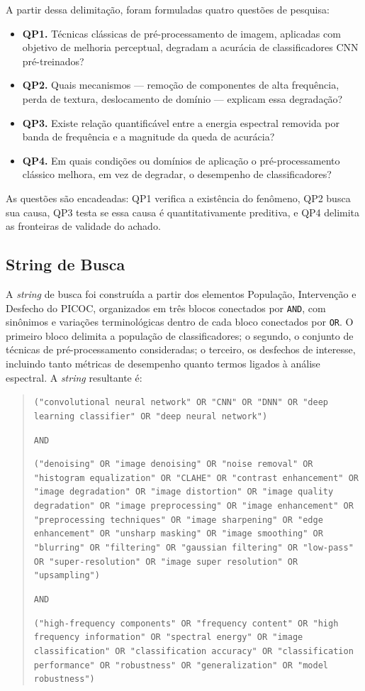 \documentclass[conference]{IEEEtran}
\begin{document}
A partir dessa delimitação, foram formuladas quatro questões de pesquisa:

\begin{itemize}
\item \textbf{QP1.} Técnicas clássicas de pré-processamento de imagem,
aplicadas com objetivo de melhoria perceptual, degradam a acurácia de
classificadores CNN pré-treinados?
\item \textbf{QP2.} Quais mecanismos --- remoção de componentes de alta
frequência, perda de textura, deslocamento de domínio --- explicam essa
degradação?
\item \textbf{QP3.} Existe relação quantificável entre a energia espectral
removida por banda de frequência e a magnitude da queda de acurácia?
\item \textbf{QP4.} Em quais condições ou domínios de aplicação o
pré-processamento clássico melhora, em vez de degradar, o desempenho de
classificadores?
\end{itemize}

As questões são encadeadas: QP1 verifica a existência do fenômeno, QP2 busca
sua causa, QP3 testa se essa causa é quantitativamente preditiva, e QP4
delimita as fronteiras de validade do achado.

\subsection{String de Busca}
\label{sec:sb}

A \textit{string} de busca foi construída a partir dos elementos População,
Intervenção e Desfecho do PICOC, organizados em três blocos conectados por
\texttt{AND}, com sinônimos e variações terminológicas dentro de cada bloco
conectados por \texttt{OR}. O primeiro bloco delimita a população de
classificadores; o segundo, o conjunto de técnicas de pré-processamento
consideradas; o terceiro, os desfechos de interesse, incluindo tanto métricas
de desempenho quanto termos ligados à análise espectral. A \textit{string}
resultante é:

\begin{quote}
\footnotesize
\texttt{("convolutional neural network" OR "CNN" OR "DNN" OR "deep learning
classifier" OR "deep neural network")}

\texttt{AND}

\texttt{("denoising" OR "image denoising" OR "noise removal" OR "histogram
equalization" OR "CLAHE" OR "contrast enhancement" OR "image degradation" OR
"image distortion" OR "image quality degradation" OR "image preprocessing" OR
"image enhancement" OR "preprocessing techniques" OR "image sharpening" OR
"edge enhancement" OR "unsharp masking" OR "image smoothing" OR "blurring" OR
"filtering" OR "gaussian filtering" OR "low-pass" OR "super-resolution" OR
"image super resolution" OR "upsampling")}

\texttt{AND}

\texttt{("high-frequency components" OR "frequency content" OR "high frequency
information" OR "spectral energy" OR "image classification" OR "classification
accuracy" OR "classification performance" OR "robustness" OR "generalization"
OR "model robustness")}
\end{quote}
\end{document}
